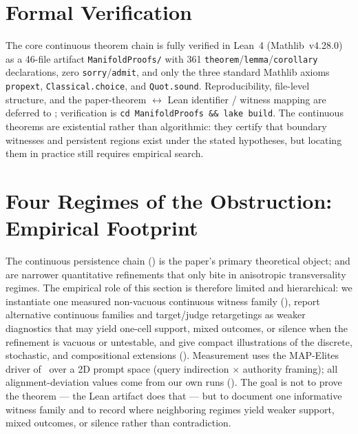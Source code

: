 \documentclass[11pt]{article}
\begin{document}
\section{Formal Verification}
\label{sec:formal-verification}

The core continuous theorem chain is fully verified in Lean~4
(Mathlib~v4.28.0) as a
46-file artifact \texttt{ManifoldProofs/} with 361
\texttt{theorem}/\texttt{lemma}/\texttt{corollary} declarations, zero
\texttt{sorry}/\texttt{admit}, and only the three standard Mathlib
axioms \texttt{propext}, \texttt{Classical.choice}, and
\texttt{Quot.sound}. Reproducibility, file-level structure, and the
paper-theorem $\leftrightarrow$ Lean identifier / witness mapping are
deferred to ; verification is
\texttt{cd ManifoldProofs \&\& lake build}. The continuous theorems are
existential rather than algorithmic: they certify that boundary
witnesses and persistent regions exist under the stated hypotheses,
but locating them in practice still requires empirical search.


\section{Four Regimes of the Obstruction: Empirical Footprint}
\label{sec:four-regimes}
\label{sec:experiments}

The continuous persistence chain
() is the paper's primary
theoretical object;  and  are narrower
quantitative refinements that only bite in anisotropic transversality
regimes. The empirical role of this section is therefore limited and
hierarchical: we instantiate one measured non-vacuous continuous
witness family (), report alternative
continuous families and target/judge retargetings as weaker diagnostics
that may yield one-cell support, mixed outcomes, or silence when the
refinement is vacuous or untestable, and
give compact illustrations of the discrete, stochastic, and
compositional extensions
().
Measurement uses the MAP-Elites driver of~\cite{munshi2026manifold}
over a 2D prompt space (query indirection $\times$ authority framing);
all alignment-deviation values come from our own runs
(). The goal is not to prove the theorem --- the
Lean artifact does that --- but to document one informative witness
family and to record where neighboring regimes yield weaker support,
mixed outcomes, or silence rather than contradiction.
\end{document}
